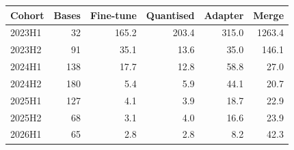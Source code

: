 \begin{tabular}{lrrrrr}
\toprule
Cohort & Bases & Fine-tune & Quantised & Adapter & Merge \\
\midrule
2023H1 & 32 & 165.2 & 203.4 & 315.0 & 1263.4 \\
2023H2 & 91 & 35.1 & 13.6 & 35.0 & 146.1 \\
2024H1 & 138 & 17.7 & 12.8 & 58.8 & 27.0 \\
2024H2 & 180 & 5.4 & 5.9 & 44.1 & 20.7 \\
2025H1 & 127 & 4.1 & 3.9 & 18.7 & 22.9 \\
2025H2 & 68 & 3.1 & 4.0 & 16.6 & 23.9 \\
2026H1 & 65 & 2.8 & 2.8 & 8.2 & 42.3 \\
\bottomrule
\end{tabular}

